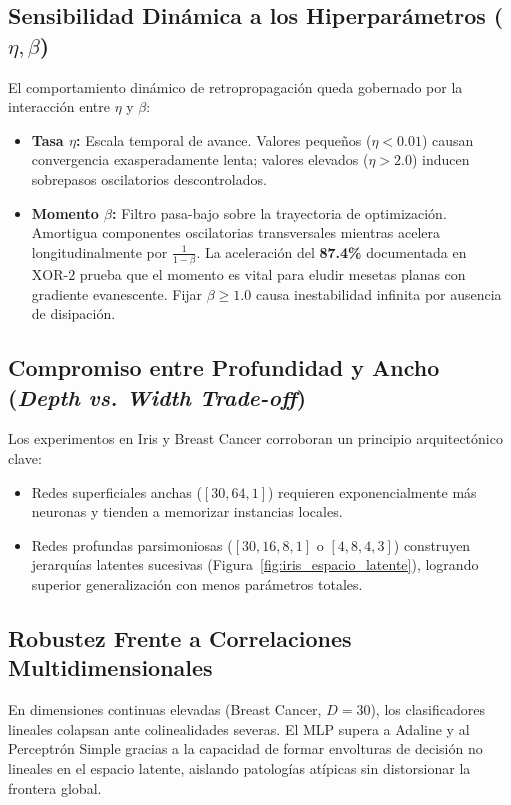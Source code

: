 \documentclass{article}
\begin{document}
\subsection{Sensibilidad Dinámica a los Hiperparámetros ($\eta, \beta$)}

El comportamiento dinámico de retropropagación queda gobernado por la interacción entre $\eta$ y $\beta$:
\begin{itemize}
    \item \textbf{Tasa $\eta$:} Escala temporal de avance. Valores pequeños ($\eta < 0.01$) causan convergencia exasperadamente lenta; valores elevados ($\eta > 2.0$) inducen sobrepasos oscilatorios descontrolados.
    \item \textbf{Momento $\beta$:} Filtro pasa-bajo sobre la trayectoria de optimización. Amortigua componentes oscilatorias transversales mientras acelera longitudinalmente por $\frac{1}{1-\beta}$. La aceleración del \textbf{87.4\%} documentada en $\text{XOR-2}$ prueba que el momento es vital para eludir mesetas planas con gradiente evanescente. Fijar $\beta \ge 1.0$ causa inestabilidad infinita por ausencia de disipación.
\end{itemize}

\subsection{Compromiso entre Profundidad y Ancho (\textit{Depth vs. Width Trade-off})}

Los experimentos en Iris y Breast Cancer corroboran un principio arquitectónico clave:
\begin{itemize}
    \item Redes superficiales anchas ($[30, 64, 1]$) requieren exponencialmente más neuronas y tienden a memorizar instancias locales.
    \item Redes profundas parsimoniosas ($[30, 16, 8, 1]$ o $[4, 8, 4, 3]$) construyen jerarquías latentes sucesivas (Figura~\ref{fig:iris_espacio_latente}), logrando superior generalización con menos parámetros totales.
\end{itemize}

\subsection{Robustez Frente a Correlaciones Multidimensionales}

En dimensiones continuas elevadas (Breast Cancer, $D=30$), los clasificadores lineales colapsan ante colinealidades severas. El MLP supera a Adaline y al Perceptrón Simple gracias a la capacidad de formar envolturas de decisión no lineales en el espacio latente, aislando patologías atípicas sin distorsionar la frontera global.
\end{document}
